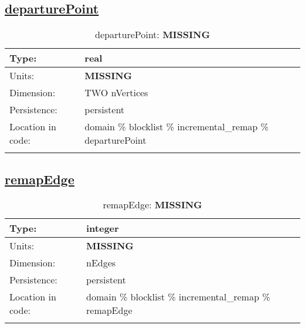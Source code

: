 \subsection[departurePoint]{\hyperref[sec:var_tab_incremental_remap]{departurePoint}}
\label{subsec:var_sec_incremental_remap_departurePoint}
\begin{center}
\begin{longtable}{| p{2.0in} | p{4.0in} |}
        \hline 
        Type: & real \\
        \hline 
        Units: & {\bf \color{red} MISSING} \\
        \hline 
        Dimension: & TWO nVertices \\
        \hline 
        Persistence: & persistent \\
        \hline 
         Location in code: & domain \% blocklist \% incremental\_remap \% departurePoint \\
         \hline 
    \caption{departurePoint: {\bf \color{red} MISSING}}
\end{longtable}
\end{center}
\subsection[remapEdge]{\hyperref[sec:var_tab_incremental_remap]{remapEdge}}
\label{subsec:var_sec_incremental_remap_remapEdge}
\begin{center}
\begin{longtable}{| p{2.0in} | p{4.0in} |}
        \hline 
        Type: & integer \\
        \hline 
        Units: & {\bf \color{red} MISSING} \\
        \hline 
        Dimension: & nEdges \\
        \hline 
        Persistence: & persistent \\
        \hline 
         Location in code: & domain \% blocklist \% incremental\_remap \% remapEdge \\
         \hline 
    \caption{remapEdge: {\bf \color{red} MISSING}}
\end{longtable}
\end{center}
